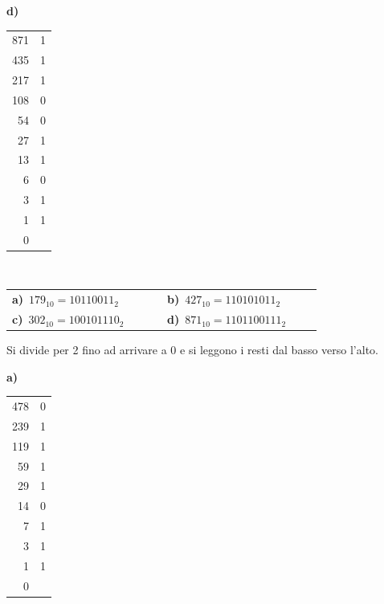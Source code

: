 \begin{esercizio}[8]
\begin{solution}
{\begin{minipage}[t]{0.24\linewidth}
  \end{minipage}\hfill
  \begin{minipage}[t]{0.24\linewidth}
  \textbf{d)}\\[2pt]
  {\small\renewcommand{\arraystretch}{1.0}\begin{tabular}{r|l}
    871 & 1\\
    435 & 1\\
    217 & 1\\
    108 & 0\\
    54 & 0\\
    27 & 1\\
    13 & 1\\
    6 & 0\\
    3 & 1\\
    1 & 1\\
    0 & \\
  \end{tabular}}
  \end{minipage}\\[6pt]
\par\smallskip\noindent\hspace*{1em}\begin{tabular}{@{}p{0.42\linewidth}p{0.42\linewidth}@{}}
  \textbf{a)}~$179_{10} = 10110011_2$ & \textbf{b)}~$427_{10} = 110101011_2$\\[4pt]
  \textbf{c)}~$302_{10} = 100101110_2$ & \textbf{d)}~$871_{10} = 1101100111_2$
\end{tabular}\par\smallskip
  Si divide per 2 fino ad arrivare a 0 e si leggono i resti dal basso verso l'alto.}{%
\noindent
  \begin{minipage}[t]{0.24\linewidth}
  \textbf{a)}\\[2pt]
  {\small\renewcommand{\arraystretch}{1.0}\begin{tabular}{r|l}
    478 & 0\\
    239 & 1\\
    119 & 1\\
    59 & 1\\
    29 & 1\\
    14 & 0\\
    7 & 1\\
    3 & 1\\
    1 & 1\\
    0 & \\
  \end{tabular}}
  \end{minipage}\hfill
  \begin{minipage}[t]{0.24\linewidth}

\end{minipage}}
\end{solution}
\end{esercizio}
